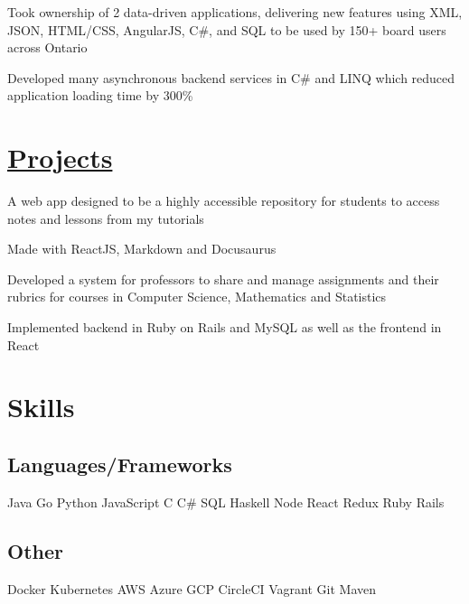 \documentclass[]{deedy-resume}
\begin{document}
\begin{tightemize}
\item Took ownership of 2 data-driven applications, delivering new features using XML, JSON, HTML/CSS, AngularJS, C\#, and SQL to be used by 150+ board users across Ontario
\item Developed many asynchronous backend services in C\# and LINQ which reduced application loading time by 300\%
\end{tightemize}
\sectionsep


\section{\href{https://github.com/ItsMeWithTheFace}{Projects}}

\begin{tightemize}
\item A web app designed to be a highly accessible repository for students to access notes and lessons from my tutorials
\item Made with ReactJS, Markdown and Docusaurus
\end{tightemize}
\sectionsep

\location{}
\begin{tightemize}
\item Developed a system for professors to share and manage assignments and their rubrics for courses in Computer Science, Mathematics and Statistics
\item Implemented backend in Ruby on Rails and MySQL as well as the frontend in React
\end{tightemize}
\sectionsep

\section{Skills}
\begin{minipage}[t]{1.0\textwidth}
\subsection{Languages/Frameworks}
Java \textbullet{} Go \textbullet{} Python \textbullet{} JavaScript \textbullet{} C \textbullet{}
C\# \textbullet{} SQL \textbullet{} Haskell \textbullet{}
Node \textbullet{} React \textbullet{} Redux \textbullet{} Ruby \textbullet{} Rails
\sectionsep
\subsection{Other}
Docker \textbullet{} Kubernetes \textbullet{} AWS \textbullet{} Azure \textbullet{} GCP
\textbullet{} CircleCI \textbullet{} Vagrant \textbullet{} Git \textbullet{} Maven
\sectionsep
\end{minipage}
\hfill
\end{document}
